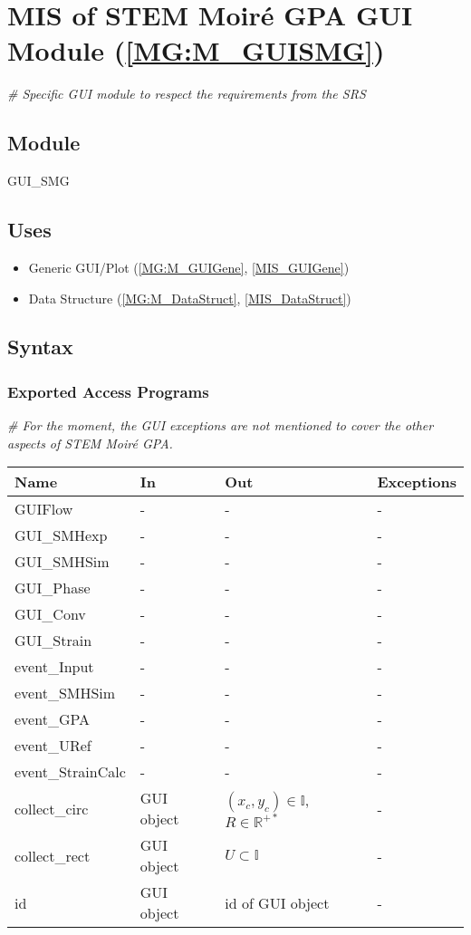 \documentclass[12pt, titlepage]{article}
\newcommand{\progname}{STEM Moir{\'e} GPA}
\begin{document}
\section{MIS of STEM Moir{\'e} GPA GUI Module 
(\texorpdfstring{\cref{MG:M_GUISMG}}))} \label{MIS_GUISMG}

\noindent\textit{{\#} Specific GUI module to respect the requirements from the 
SRS}\medskip

\subsection{Module}
GUI{\_}SMG
\subsection{Uses}
\begin{itemize}
\item Generic GUI/Plot (\cref{MG:M_GUIGene}, \cref{MIS_GUIGene})
\item Data Structure (\cref{MG:M_DataStruct}, \cref{MIS_DataStruct})
\end{itemize}

\subsection{Syntax}

\subsubsection{Exported Access Programs}

\noindent\textit{{\#} For the moment, the GUI exceptions are not mentioned to 
cover the other aspects of \progname{}.}\medskip

\begin{center}
\begin{tabular}{p{4cm} p{3cm} p{3cm} p{3cm}}
\hline
\textbf{Name} & \textbf{In} & \textbf{Out} & \textbf{Exceptions} \\
\hline
GUIFlow & - & - & - \\
GUI{\_}SMHexp & - & - & - \\
GUI{\_}SMHSim & - & - & - \\
GUI{\_}Phase & - & - & - \\
GUI{\_}Conv & - & - & - \\
GUI{\_}Strain & - & - & - \\
event{\_}Input & - & - & - \\
event{\_}SMHSim & - & - & - \\
event{\_}GPA & - & - & - \\
event{\_}URef & - & - & - \\
event{\_}StrainCalc & - & - & - \\
collect{\_}circ & GUI object & $(x_c,y_c)\in\mathbb{I}$,$R \in\mathbb{R}^{+*}$ & 
- \\
collect{\_}rect & GUI object & $U \subset \mathbb{I}$ & -\\
id & GUI object & id of GUI object & - \\
\hline
\end{tabular}
\end{center}
\end{document}
